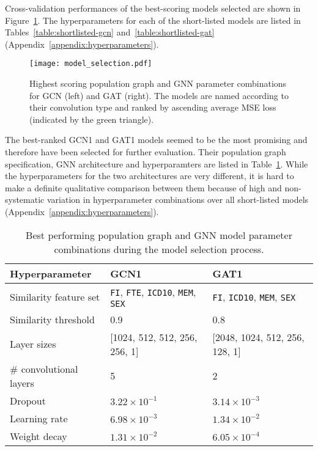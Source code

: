 Cross-validation performances of the best-scoring models selected are shown in Figure~\ref{figure:gat-gcn-rank}. The hyperparameters for each of the short-listed models are listed in Tables~\ref{table:shortlisted-gcn} and~\ref{table:shortlisted-gat} (Appendix~\ref{appendix:hyperparameters}).

\begin{figure}[!h]
    \centering
    \texttt{[image: model\_selection.pdf]}
    \caption{Highest scoring population graph and GNN parameter combinations for GCN (left) and GAT (right). The models are named according to their convolution type and ranked by ascending average MSE loss (indicated by the green triangle).}\label{figure:gat-gcn-rank}
\end{figure}

The best-ranked GCN1 and GAT1 models seemed to be the most promising and therefore have been selected for further evaluation. Their population graph specification, GNN architecture and hyperparamters are listed in Table~\ref{table:best-hyperparameters}. While the hyperparameters for the two architectures are very different, it is hard to make a definite qualitative comparison between them because of high and non-systematic variation in hyperparameter combinations over all short-listed models (Appendix~\ref{appendix:hyperparameters}).

\begin{table}[]
    \caption{Best performing population graph and GNN model parameter combinations during the model selection process.}\label{table:best-hyperparameters}
    \centering
    \small
    \begin{tabular}{p{}p{}p{}}
        \hline
    \textbf{Hyperparameter} & \textbf{GCN1} & \textbf{GAT1} \\  \hline
        Similarity feature set & \texttt{FI}, \texttt{FTE}, \texttt{ICD10}, \texttt{MEM}, \texttt{SEX} & \texttt{FI}, \texttt{ICD10}, \texttt{MEM}, \texttt{SEX} \\
        Similarity threshold & 0.9 & 0.8 \\ \hline
        Layer sizes & [1024, 512, 512, 256, 256, 1] & [2048, 1024, 512, 256, 128, 1] \\
        \# convolutional layers & 5 & 2 \\
        Dropout & $3.22 \times 10^{-1}$ & $3.14 \times 10^{-3}$ \\
        Learning rate & $6.98 \times 10^{-3}$ & $1.34 \times 10^{-2}$ \\
        Weight decay & $1.31 \times 10^{-2}$ & $6.05 \times 10^{-4}$ \\ \hline
\end{tabular}
\end{table}

